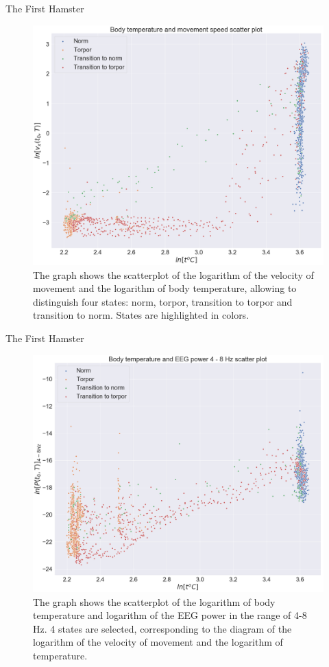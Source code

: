 \documentclass[10pt]{beamer}
\begin{document}
\begin{frame}[fragile]{The First Hamster}
\begin{figure}[H]
\centering
\includegraphics[width=0.7\linewidth]{exp1_5.png}
\caption{The graph shows the scatterplot of the logarithm of the velocity of movement and the logarithm of body temperature, allowing to distinguish four states: norm, torpor, transition to torpor and transition to norm. States are highlighted in colors.}\label{fig:lactate_receptors}
\end{figure}
\end{frame}


\begin{frame}[fragile]{The First Hamster}
\begin{figure}[H]
\centering
\includegraphics[width=0.7\linewidth]{exp1_6.png}
\caption{The graph shows the scatterplot of the logarithm of body temperature and logarithm of the EEG power in the range of 4-8 Hz. 4 states are selected, corresponding to the diagram of the logarithm of the velocity of movement and the logarithm of temperature.}\label{fig:lactate_receptors}
\end{figure}
\end{frame}
\end{document}
